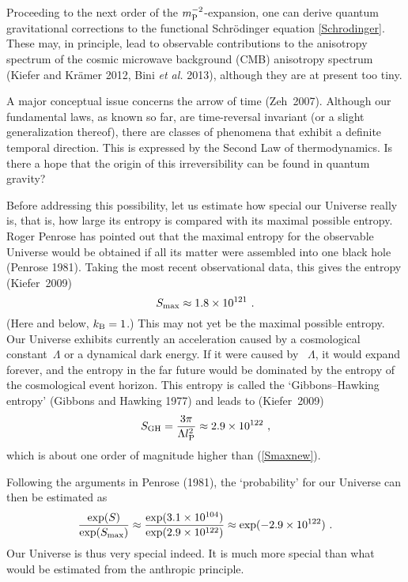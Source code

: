 \documentclass[12pt]{article}
\newcommand{\be}{\begin{equation}}
\newcommand{\ee}{\end{equation}}
\newcommand{\lb}{\label}
\begin{document}
Proceeding to the next order of the $m_{\rm P}^{-2}$-expansion, one
can derive quantum gravitational corrections to the functional
Schr\"odinger equation \eqref{Schrodinger}. These may, in principle, lead to
observable contributions to the anisotropy spectrum of the cosmic
microwave background (CMB) anisotropy spectrum (Kiefer and Kr\"amer
2012, Bini {\em et al.} 2013), although they are at present too tiny. 

A major conceptual issue concerns the arrow of time
(Zeh~2007). Although our fundamental laws, as known so far, are
time-reversal invariant (or a slight generalization thereof), there
are classes of phenomena that exhibit a definite temporal
direction. This is expressed by the Second Law of thermodynamics. 
Is there a hope that the origin of this irreversibility can be found in
quantum gravity?

Before addressing this possibility, let us estimate how special our
Universe really is, that is, how large its entropy is compared with its
maximal possible entropy.
Roger Penrose has pointed out that the maximal
entropy for the observable Universe would be obtained if all its
matter were assembled into one black hole (Penrose 1981).
Taking the most recent
observational data, this gives the entropy (Kiefer~2009)
\be
\lb{Smaxnew}
S_{\rm max}\approx 1.8\times 10^{121} \ . 
\ee
(Here and below, $k_{\rm B}=1$.)
This may not yet be the maximal possible entropy. Our Universe
exhibits currently an acceleration caused by a
cosmological constant~$\Lambda$ or a dynamical dark energy. If it were
caused by ~$\Lambda$, it would expand 
forever, and the entropy in the far future would be dominated by the
entropy of the cosmological event horizon. This entropy is called
the `Gibbons--Hawking entropy' (Gibbons and Hawking 1977)
and leads to (Kiefer~2009)
\be
\lb{Sgh}
S_{\rm GH}=\frac{3\pi}{\Lambda l_{\rm P}^2}\approx 2.9\times
10^{122}\ ,
\ee
which is about one order of magnitude higher than (\ref{Smaxnew}).

Following the arguments in Penrose (1981), the `probability' for
our Universe can then be estimated as
\be
\frac{\exp(S)}{\exp(S_{\rm max})}\approx \frac{\exp(3.1\times
  10^{104})}{\exp(2.9\times 10^{122})}\approx \exp(-2.9\times
10^{122})\ .
\ee
Our Universe is thus very special indeed. It is much more special than
what would be estimated from the anthropic principle. 
\end{document}
